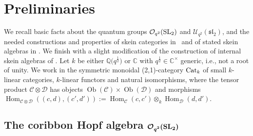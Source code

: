 \documentclass[pdftex]{sigma}%
\numberwithin{equation}{section}
\newcommand{\Hom}{\operatorname{Hom}}
\newcommand{\Oq}{\mathcal{O}_{q^2}({\rm SL}_2)}
\newcommand{\Uq}{\mathcal{U}_{q^2}(\mathfrak{sl}_2)}
\begin{document}
\section{Preliminaries}\label{SectPreliminaries}
We recall basic facts about the quantum groups $\Oq$ and $\Uq$, and the needed constructions and properties of skein categories in~\cite{Cooke} and of stated skein algebras in \cite{Cos}. We finish with a slight modification of the construction of internal skein algebras of \cite{Gunningham}. Let $k$ be either $\mathbb{Q}\big(q^{\frac{1}{2}}\big)$ or $\mathbb{C}$ with $q^{\frac{1}{2}} \in \mathbb{C}^\times$ generic, i.e., not a root of unity. We work in the symmetric monoidal (2,1)-category ${\rm Cat}_k$ of small $k$-linear categories, $k$-linear functors and natural isomorphisms, where the tensor product $\mathcal{C} \otimes \mathcal{D}$ has objects $\operatorname{Ob}(\mathcal{C}) \times \operatorname{Ob}(\mathcal{D})$ and morphisms $\Hom_{\mathcal{C} \otimes \mathcal{D}}((c,d),(c',d')) := \Hom_\mathcal{C}(c,c') \otimes_k \Hom_\mathcal{D}(d,d')$.

\subsection[The coribbon Hopf algebra O\_\{q\textasciicircum{}2\}(SL\_2)]
{The coribbon Hopf algebra $\boldsymbol{\Oq}$}\label{SectRibCat}
\end{document}
